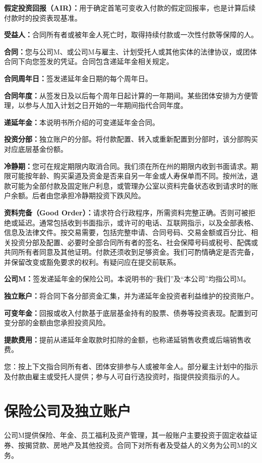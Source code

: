 \documentclass[UTF8,fontset=none,11pt,a4paper]{ctexart}
\begin{document}
\textbf{假定投资回报（AIR）：}用于确定首笔可变收入付款的假定回报率，也是计算后续付款时的投资表现基准。


\textbf{受益人：}合同所有者或被年金人死亡时，取得持续付款或一次性付款等保障的人。


\textbf{合同：}您与公司M、或公司M与雇主、计划受托人或其他实体的法律协议，或团体合同下向您签发的凭证。合同包含递延年金相关规定。


\textbf{合同周年日：}签发递延年金日期的每个周年日。


\textbf{合同年度：}从签发日及以后每个周年日起计算的一年期间。某些团体安排为方便管理，以参与人加入计划之日开始的一年期间指代合同年度。


\textbf{递延年金：}本说明书所介绍的可变递延年金合同。


\textbf{投资分部：}独立账户的分部。将付款配置、转入或重新配置到分部时，该分部购买对应底层基金份额。


\textbf{冷静期：}您可在规定期限内取消合同。我们须在所在州的期限内收到书面请求。期限可能按年龄、购买渠道及资金是否来自另一年金或人寿保单而不同。按州法，退款可能为全部付款及固定账户利息，或管理办公室以资料完备状态收到请求时的账户余额。后者由您承担冷静期投资下跌风险。


\textbf{资料完备（Good Order）：}请求符合行政程序，所需资料完整正确。否则可被拒绝或延迟。通常包括收到书面指示，或许可的电话、互联网指示，以及全部表格、信息及法律文件。按交易需要，包括完整申请、合同号码、交易金额或百分比、相关投资分部及配置、必要时全部合同所有者的签名、社会保障号码或税号、配偶或共同所有者同意及其他证明。付款还须收到足够资金。我们可酌情确定是否完备，并保留改变或豁免要求的权利。有疑问应在提交前联系。


\textbf{公司M：}签发递延年金的保险公司。本说明书的“我们”及“本公司”均指公司M。


\textbf{独立账户：}将合同下各分部资金汇集，并为递延年金投资者利益维护的投资账户。


\textbf{可变年金：}回报或收入付款基于底层基金持有的股票、债券等投资表现。配置到可变分部的金额由您承担投资风险。


\textbf{提款费用：}提前从递延年金取款时扣除的金额，也称递延销售收费或后端销售收费。


您：按上下文指合同所有者、团体安排参与人或被年金人。部分雇主计划中的指示及付款由雇主或受托人提供；参与人可自行选投资时，指提供投资指示的人。


\section*{保险公司及独立账户}
公司M提供保险、年金、员工福利及资产管理，其一般账户主要投资于固定收益证券、按揭贷款、房地产及其他投资。合同下对所有者及受益人的义务为公司M的义务。
\end{document}
